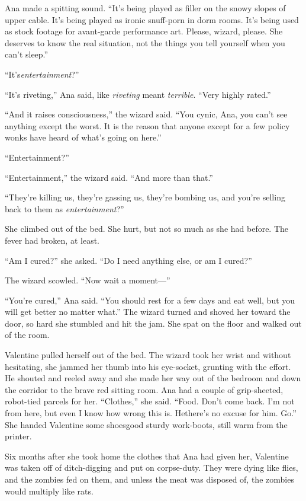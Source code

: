 Ana made a spitting sound. “It’s being played as filler on the
snowy slopes of upper cable. It’s being played as ironic snuff-porn
in dorm rooms. It’s being used as stock footage for avant-garde
performance art. Please, wizard, please. She deserves to know the
real situation, not the things you tell yourself when you can’t
sleep.”

“It’s\dash{}\emph{entertainment}?”

“It’s riveting,” Ana said, like \emph{riveting} meant
\emph{terrible}. “Very highly rated.”

“And it raises consciousness,” the wizard said. “You cynic, Ana,
you can’t see anything except the worst. It is the reason that
anyone except for a few policy wonks have heard of what’s going on
here.”

“Entertainment?”

“Entertainment,” the wizard said. “And more than that.”

“They’re killing us, they’re gassing us, they’re bombing us, and
you’re selling back to them as \emph{entertainment}?”

She climbed out of the bed. She hurt, but not so much as she had
before. The fever had broken, at least.

“Am I cured?” she asked. “Do I need anything else, or am I cured?”

The wizard scowled. “Now wait a moment---”

“You’re cured,” Ana said. “You should rest for a few days and eat
well, but you will get better no matter what.” The wizard turned
and shoved her toward the door, so hard she stumbled and hit the
jam. She spat on the floor and walked out of the room.

Valentine pulled herself out of the bed. The wizard took her wrist
and without hesitating, she jammed her thumb into his eye-socket,
grunting with the effort. He shouted and reeled away and she made
her way out of the bedroom and down the corridor to the brave red
sitting room. Ana had a couple of grip-sheeted, robot-tied parcels
for her. “Clothes,” she said. “Food. Don’t come back. I’m not from
here, but even I know how wrong this is. He\dash{}there’s no excuse for
him. Go.” She handed Valentine some shoes\dash{}good sturdy work-boots,
still warm from the printer.

\tb

Six months after she took home the clothes that Ana had given her,
Valentine was taken off of ditch-digging and put on corpse-duty.
They were dying like flies, and the zombies fed on them, and unless
the meat was disposed of, the zombies would multiply like rats.

